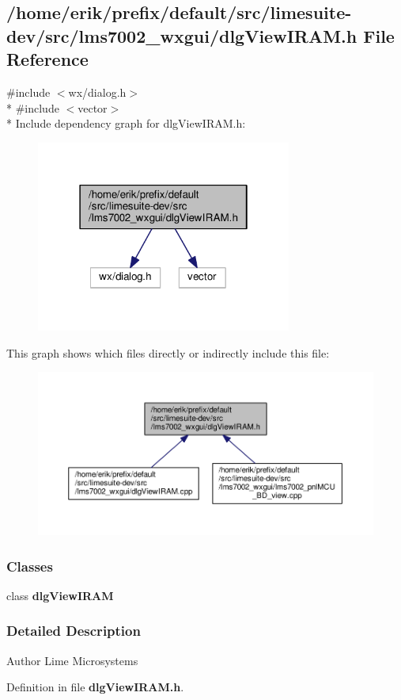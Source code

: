 \subsection{/home/erik/prefix/default/src/limesuite-\/dev/src/lms7002\+\_\+wxgui/dlg\+View\+I\+R\+AM.h File Reference}
\label{dlgViewIRAM_8h}
{\ttfamily \#include $<$wx/dialog.\+h$>$}\\*
{\ttfamily \#include $<$vector$>$}\\*
Include dependency graph for dlg\+View\+I\+R\+A\+M.\+h\+:
\nopagebreak
\begin{figure}[H]
\begin{center}
\leavevmode
\includegraphics[width=238pt]{dc/dbc/dlgViewIRAM_8h__incl}
\end{center}
\end{figure}
This graph shows which files directly or indirectly include this file\+:
\nopagebreak
\begin{figure}[H]
\begin{center}
\leavevmode
\includegraphics[width=350pt]{d6/da3/dlgViewIRAM_8h__dep__incl}
\end{center}
\end{figure}
\subsubsection*{Classes}
\begin{DoxyCompactItemize}
\item 
class {\bf dlg\+View\+I\+R\+AM}
\end{DoxyCompactItemize}


\subsubsection{Detailed Description}
\begin{DoxyAuthor}{Author}
Lime Microsystems 
\end{DoxyAuthor}


Definition in file {\bf dlg\+View\+I\+R\+A\+M.\+h}.

